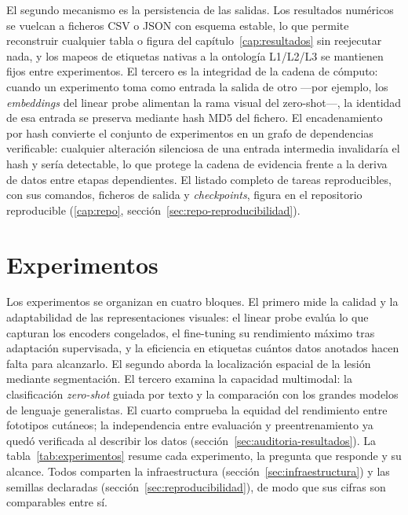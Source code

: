 El segundo mecanismo es la persistencia de las salidas. Los
resultados numéricos se vuelcan a ficheros CSV o JSON con esquema
estable, lo que permite reconstruir cualquier tabla o figura del
capítulo~\ref{cap:resultados} sin reejecutar nada, y los mapeos de
etiquetas nativas a la ontología L1/L2/L3 se mantienen fijos entre
experimentos. El tercero es la integridad de la cadena de cómputo:
cuando un experimento toma como entrada la salida de otro ---por
ejemplo, los \emph{embeddings} del linear probe alimentan la rama
visual del zero-shot---, la identidad de esa entrada se preserva
mediante hash MD5 del fichero. El encadenamiento por hash convierte
el conjunto de experimentos en un grafo de dependencias verificable:
cualquier alteración silenciosa de una entrada intermedia
invalidaría el hash y sería detectable, lo que protege la cadena de
evidencia frente a la deriva de datos entre etapas dependientes. El
listado completo de tareas reproducibles, con sus comandos, ficheros
de salida y \emph{checkpoints}, figura en el
repositorio reproducible (\ref{cap:repo}, sección~\ref{sec:repo-reproducibilidad}).

\section{Experimentos}
\label{sec:protocolos}

Los experimentos se organizan en cuatro bloques. El primero mide la
calidad y la adaptabilidad de las representaciones visuales: el
linear probe evalúa lo que capturan los encoders congelados, el
fine-tuning su rendimiento máximo tras adaptación supervisada, y la
eficiencia en etiquetas cuántos datos anotados hacen falta para
alcanzarlo. El segundo aborda la localización espacial de la lesión
mediante segmentación. El tercero examina la capacidad multimodal: la
clasificación \emph{zero-shot} guiada por texto y la comparación con
los grandes modelos de lenguaje generalistas. El cuarto comprueba la
equidad del rendimiento entre fototipos cutáneos; la independencia
entre evaluación y preentrenamiento ya quedó verificada al describir
los datos (sección~\ref{sec:auditoria-resultados}). La tabla~\ref{tab:experimentos} resume cada
experimento, la pregunta que responde y su alcance. Todos comparten
la infraestructura (sección~\ref{sec:infraestructura}) y las semillas
declaradas (sección~\ref{sec:reproducibilidad}), de modo que sus
cifras son comparables entre sí.

